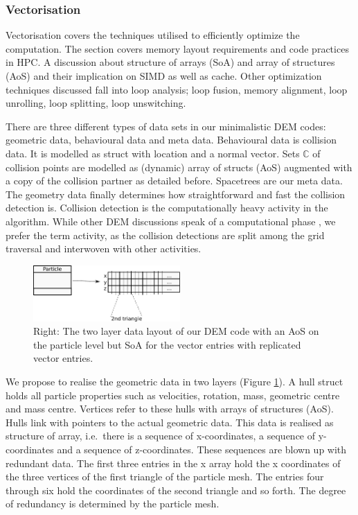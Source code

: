\documentclass[times,12pt]{article}
\begin{document}
\subsubsection{Vectorisation}

Vectorisation covers the techniques utilised to efficiently optimize the computation. The section covers memory layout requirements and code practices in HPC. A discussion about structure of arrays (SoA) and array of structures (AoS) and their implication on SIMD as well as cache. Other optimization techniques discussed fall into loop analysis; loop fusion, memory alignment, loop unrolling, loop splitting, loop unswitching.

There are three different types of data sets in our minimalistic DEM codes: 
geometric data, behavioural data and meta data. 
Behavioural data is collision data.
It is modelled as struct with location and a normal vector.
Sets $\mathbb{C}$ of collision points are modelled as (dynamic) array of structs
(AoS) augmented with a copy of the collision partner as detailed before.
Spacetrees are our meta data.
The geometry data finally determines how straightforward and fast the collision
detection is. Collision detection is the computationally heavy activity in the
algorithm.
While other DEM discussions speak of a computational phase \cite{Wachs2012, Wachs2012a, Rycroft2012, Parteli2013}, we
prefer the term activity, as the collision detections are split among the grid traversal
and interwoven with other activities.

\begin{figure}
 \begin{center}
  \includegraphics[width=0.5\textwidth]{sketches/data-structure.pdf}
 \end{center}
 \caption{
   Right: The two layer data layout of our DEM code with an AoS on the particle
   level but SoA for the vector entries with replicated vector entries.
 }
 \label{figure:data-structure}
\end{figure}

We propose to realise the geometric data in two layers (Figure
\ref{figure:data-structure}).
A hull struct holds all particle properties such as velocities, rotation, mass,
geometric centre and mass centre.
Vertices refer to these hulls with arrays of structures (AoS).
Hulls link with pointers to the actual geometric data. 
This data is realised as structure of array, i.e.~there is a sequence of
x-coordinates, a sequence of y-coordinates and a sequence of z-coordinates.
These sequences are blown up with redundant data.
The first three entries in the x array hold the x coordinates of the three
vertices of the first triangle of the particle mesh.
The entries four through six hold the coordinates of the second triangle and so
forth. 
The degree of redundancy is determined by the particle mesh.
\end{document}
